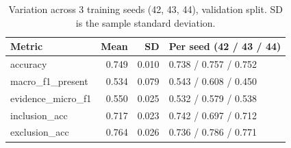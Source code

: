 \begin{table}[t]
\centering
\footnotesize
\caption{Variation across 3 training seeds (42, 43, 44), validation split. SD is the sample standard deviation.}
\label{tab:seeds}
\begin{tabular}{lrrl}
\toprule
Metric & Mean & SD & Per seed (42 / 43 / 44) \\
\midrule
accuracy & 0.749 & 0.010 & 0.738 / 0.757 / 0.752 \\
macro\_f1\_present & 0.534 & 0.079 & 0.543 / 0.608 / 0.450 \\
evidence\_micro\_f1 & 0.550 & 0.025 & 0.532 / 0.579 / 0.538 \\
inclusion\_acc & 0.717 & 0.023 & 0.742 / 0.697 / 0.712 \\
exclusion\_acc & 0.764 & 0.026 & 0.736 / 0.786 / 0.771 \\
\bottomrule
\end{tabular}
\end{table}
